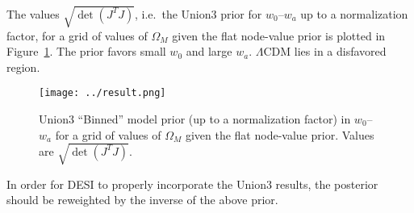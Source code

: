 \documentclass[11pt, oneside]{article}   	%
\begin{document}
The values $\sqrt{\det{\left(J^T J\right)}}$,  i.e.\ the Union3 prior for $w_0$--$w_a$ up to a normalization factor,  for a grid of values of $\Omega_M$
given the flat node-value prior is plotted in Figure~\ref{fig:priors}. 
The prior favors small $w_0$ and large $w_a$.  $\Lambda$CDM lies in a disfavored region.
\begin{figure}[htbp] %
   \centering
   \texttt{[image: ../result.png]} 
   \caption{Union3 ``Binned'' model prior (up to a normalization factor)  in $w_0$--$w_a$ for a grid of values of $\Omega_M$ given the flat node-value prior.
   Values are $\sqrt{\det{\left(J^T J\right)}}$.}
   \label{fig:priors}
\end{figure}
In order for DESI to properly incorporate the Union3 results, the posterior should be reweighted by the inverse of the above prior.
\end{document}
